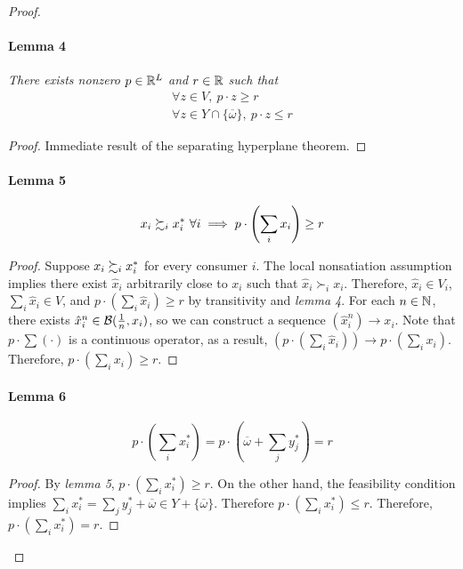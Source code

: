\documentclass{report}
\begin{document}
\begin{proof}
			\paragraph{Lemma 4} \emph{There exists nonzero $p \in \mathbb{R}^L$ and $r \in \mathbb{R}$ such that }
			\begin{align}
				\forall z \in V,\ p \cdot z \geq r \\
				\forall z \in Y \cap \{\overline{\omega}\},\ p \cdot z \leq r
			\end{align}
			\begin{proof}
				Immediate result of the separating hyperplane theorem.
			\end{proof}
			\paragraph{Lemma 5}
			\begin{equation}
				x_i \succsim_i x_i^*\ \forall i \implies p \cdot \left( \sum_i x_i \right) \geq r
			\end{equation}
			\begin{proof}
				Suppose $x_i \succsim_i x_i^*$ for every consumer $i$. The local nonsatiation assumption implies there exist $\hat{x}_i$ arbitrarily close to $x_i$ such that $\hat{x}_i \succ_i x_i$. Therefore, $\hat{x}_i \in V_i$, $\sum_i \hat{x}_i \in V$, and $p \cdot \left( \sum_i \hat{x}_i \right) \geq r$ by transitivity and \emph{lemma 4}. For each $n \in \mathbb{N}$, there exists $\hat{x}_i^n \in \mathcal{{B}}(\frac{1}{n}, x_i)$, so we can construct a sequence $(\hat{x}^n_i) \to x_i$. Note that $p \cdot \sum (\cdot)$ is a continuous operator, as a result, $\left(p \cdot \left( \sum_i \hat{x}_i \right)\right) \to p \cdot \left( \sum_i x_i \right)$. Therefore, $p \cdot \left( \sum_i x_i \right) \geq r$.
			\end{proof}
			\paragraph{Lemma 6}
			\begin{equation}
				p \cdot \left( \sum_i x_i^* \right) = p \cdot \left ( \overline{\omega} + \sum_{j} y_j^* \right ) = r
			\end{equation}
			\begin{proof}
				By \emph{lemma 5}, $p \cdot \left( \sum_i x_i^* \right) \geq r$. On the other hand, the feasibility condition implies $\sum_i x_i^* = \sum_j y_j^* + \overline{\omega} \in Y + \{\overline{\omega}\}$. Therefore $p \cdot \left (\sum_i x_i^* \right) \leq r$. Therefore, $p \cdot \left( \sum_i x_i^* \right) = r$.
			\end{proof}

\end{proof}
\end{document}

